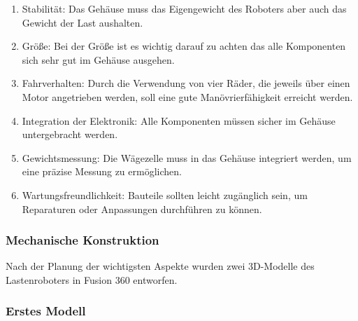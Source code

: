 \documentclass[ngerman,12pt,a4paper]{article}
\begin{document}
		\begin{enumerate}
			\item Stabilität: Das Gehäuse muss das Eigengewicht des Roboters aber auch das Gewicht der Last aushalten.
			\item Größe: Bei der Größe ist es wichtig darauf zu achten das alle Komponenten sich sehr gut im Gehäuse ausgehen.
			\item Fahrverhalten: Durch die Verwendung von vier Räder, die jeweils über einen Motor angetrieben werden, soll eine gute Manövrierfähigkeit erreicht werden.
			\item Integration der Elektronik: Alle Komponenten müssen sicher im Gehäuse untergebracht werden.
			\item Gewichtsmessung: Die Wägezelle muss in das Gehäuse integriert werden, um eine präzise Messung zu ermöglichen.
			\item Wartungsfreundlichkeit: Bauteile sollten leicht zugänglich sein, um Reparaturen oder Anpassungen durchführen zu können.			
		\end{enumerate}
		
			\subsubsection*{Mechanische Konstruktion}
			
		Nach der Planung der wichtigsten Aspekte wurden zwei 3D-Modelle des Lastenroboters in Fusion 360 entworfen.
		
		\newpage
		
			\subsubsection*{Erstes Modell} 
			
			\vspace{20pt}
			
\end{document}
